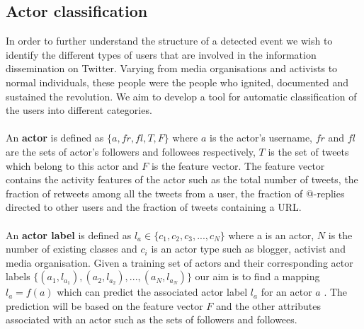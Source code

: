 \subsection{Actor classification  }\label{sec:ActorClassification}
In order to further understand the structure of a detected event we wish to identify the different types of users that are involved in the information dissemination on Twitter. Varying from media organisations and activists to normal individuals, these people were the people who ignited, documented and sustained the revolution. We aim to develop a tool for automatic classification of the users into different categories.\\\\
An \textbf{actor} is defined as $\{a, fr, fl, T, F\}$ where \boldmath $a$ \unboldmath is the actor's username, $fr$ and $fl$ are the sets of actor's followers and followees respectively, $T$ is the set of tweets which belong to this actor and $F$ is the feature vector. The feature vector contains the activity features of the actor such as the total number of tweets, the fraction of retweets among all the tweets from a user, the fraction of @-replies directed to other users and the fraction of tweets containing a URL.\\\\
An \textbf{actor label} is defined as $l_a \in \{c_1, c_2, c_3,..., c_N\}$ where a is an actor, $N$ is the number of existing classes and $c_i$ is an actor type such as blogger, activist and media organisation. 
Given a training set of actors and their corresponding actor labels $\{(a_1, l_{a_1}), (a_2, l_{a_2}),..., (a_N, l_{a_N})\}$ our aim is to find a mapping $l_a = f(a)$ which can predict the associated actor label $l_a$ for an actor \boldmath $a$ \unboldmath. The prediction will be based on the feature vector $F$ and the other attributes associated with an actor such as the sets of followers and followees.
